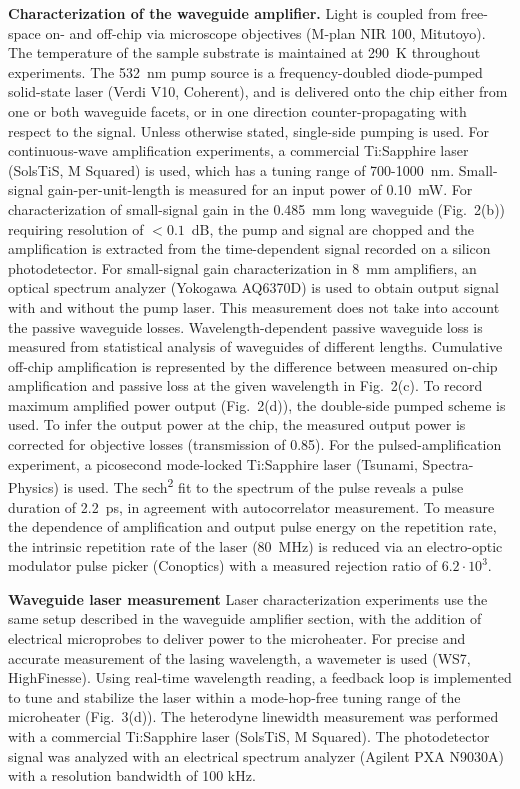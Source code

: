 \documentclass[amsmath, amsthm, amssymb, aps, prb, superscriptaddress, twocolumn, nofootinbib, 10pt]{revtex4-1}%
\begin{document}
\noindent\textbf{Characterization of the waveguide amplifier.}
Light is coupled from free-space on- and off-chip via microscope objectives (M-plan NIR 100, Mitutoyo). The temperature of the sample substrate is maintained at 290~K throughout experiments. The 532~nm pump source is a frequency-doubled diode-pumped solid-state laser (Verdi V10, Coherent), and is delivered onto the chip either from one or both waveguide facets, or in one direction counter-propagating with respect to the signal. Unless otherwise stated, single-side pumping is used. For continuous-wave amplification experiments, a commercial Ti:Sapphire laser (SolsTiS, M Squared) is used, which has a tuning range of 700-1000~nm. Small-signal gain-per-unit-length is measured for an input power of 0.10~mW. For characterization of small-signal gain in the 0.485~mm long waveguide (Fig.~2(b)) requiring resolution of $<0.1$~dB, the pump and signal are chopped and the amplification is extracted from the time-dependent signal recorded on a silicon photodetector. For small-signal gain characterization in 8~mm amplifiers, an optical spectrum analyzer (Yokogawa AQ6370D) is used to obtain output signal with and without the pump laser. This measurement does not take into account the passive waveguide losses. Wavelength-dependent passive waveguide loss is measured from statistical analysis of waveguides of different lengths. Cumulative off-chip amplification is represented by the difference between measured on-chip amplification and passive loss at the given wavelength in Fig.~2(c). To record maximum amplified power output (Fig.~2(d)), the double-side pumped scheme is used. To infer the output power at the chip, the measured output power is corrected for objective losses (transmission of 0.85). For the pulsed-amplification experiment, a picosecond mode-locked Ti:Sapphire laser (Tsunami, Spectra-Physics) is used. The sech\textsuperscript{2} fit to the spectrum of the pulse reveals a pulse duration of 2.2~ps, in agreement with autocorrelator measurement. To measure the dependence of amplification and output pulse energy on the repetition rate, the intrinsic repetition rate of the laser (80~MHz) is reduced via an electro-optic modulator pulse picker (Conoptics) with a measured rejection ratio of $6.2\cdot10^3$. 
%
\newline

\noindent\textbf{Waveguide laser measurement}
Laser characterization experiments use the same setup described in the waveguide amplifier section, with the addition of electrical microprobes to deliver power to the microheater. For precise and accurate measurement of the lasing wavelength, a wavemeter is used (WS7, HighFinesse). Using real-time wavelength reading, a feedback loop is implemented to tune and stabilize the laser within a mode-hop-free tuning range of the microheater (Fig.~3(d)). The heterodyne linewidth measurement was performed with a commercial Ti:Sapphire laser (SolsTiS, M Squared). The photodetector signal was analyzed with an electrical spectrum analyzer (Agilent PXA N9030A) with a resolution bandwidth of 100 kHz.
\end{document}
